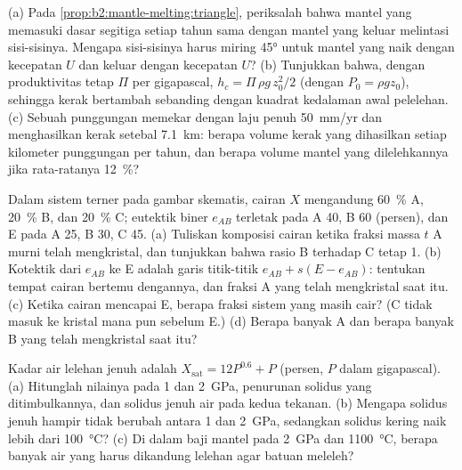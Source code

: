 \begin{exercise}[$\star\star\star$]\label{exo:b2:mantle-melting:10}
(a) Pada \cref{prop:b2:mantle-melting:triangle}, periksalah bahwa mantel yang memasuki
dasar segitiga setiap tahun sama dengan mantel yang keluar melintasi sisi-sisinya. Mengapa
sisi-sisinya harus miring \ang{45} untuk mantel yang naik dengan kecepatan $U$ dan keluar dengan kecepatan $U$?
(b) Tunjukkan bahwa, dengan produktivitas tetap $\Pi$ per gigapascal, $h_c = \Pi\,\rho
g\,z_0^2/2$ (dengan $P_0 = \rho g z_0$), sehingga kerak bertambah sebanding dengan kuadrat
kedalaman awal pelelehan. (c) Sebuah punggungan memekar dengan laju penuh \qty{50}{mm/yr} dan
menghasilkan kerak setebal \qty{7.1}{km}: berapa volume kerak yang dihasilkan setiap kilometer punggungan
per tahun, dan berapa volume mantel yang dilelehkannya jika  rata-ratanya
\qty{12}{\percent}?
\end{exercise}

\begin{exercise}[$\star\star\star$]\label{exo:b2:mantle-melting:11}
Dalam sistem terner pada gambar skematis, cairan $X$ mengandung
\qty{60}{\percent} A, \qty{20}{\percent} B, dan \qty{20}{\percent} C;
eutektik biner $e_{AB}$ terletak pada A 40, B 60 (persen), dan  E pada
A 25, B 30, C 45. (a) Tuliskan komposisi cairan ketika fraksi massa $t$
A murni telah mengkristal, dan tunjukkan bahwa rasio B terhadap C tetap 1. (b) Kotektik
dari $e_{AB}$ ke E adalah garis titik-titik $e_{AB} + s(E - e_{AB})$: tentukan
tempat cairan bertemu dengannya, dan fraksi A yang telah mengkristal saat itu. (c) Ketika
cairan mencapai E, berapa fraksi sistem yang masih cair? (C tidak masuk ke kristal
mana pun sebelum E.) (d) Berapa banyak A dan berapa banyak B yang telah mengkristal saat itu?
\end{exercise}

\begin{exercise}[$\star\star\star$]\label{exo:b2:mantle-melting:12}
Kadar air lelehan jenuh adalah $X_{\mathrm{sat}} = 12P^{0.6} + P$
(persen, $P$ dalam gigapascal). (a) Hitunglah nilainya pada 1 dan \qty{2}{GPa}, penurunan solidus
yang ditimbulkannya, dan solidus jenuh air pada kedua tekanan. (b) Mengapa
solidus jenuh hampir tidak berubah antara 1 dan \qty{2}{GPa}, sedangkan solidus kering
naik lebih dari \qty{100}{\celsius}? (c) Di dalam baji mantel pada \qty{2}{GPa} dan
\qty{1100}{\celsius}, berapa banyak air yang harus dikandung lelehan agar batuan meleleh?
\end{exercise}

